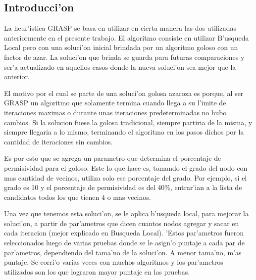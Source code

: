 \subsection{Introducci'on}
La heur'istica GRASP se basa en utilizar en cierta manera las dos utilizadas anteriormente en el presente trabajo. El algoritmo consiste en utilizar B'usqueda Local pero con una soluci'on inicial brindada por un algoritmo goloso con un factor de azar. La soluci'on que brinda se guarda para futuras comparaciones y ser'a actualizado en aquellos casos donde la nueva soluci'on sea mejor que la anterior.

El motivo por el cual se parte de una soluci'on golosa azaroza es porque, al ser GRASP un algoritmo que solamente termina cuando llega a su l'imite de iteraciones maximas o durante unas iteraciones predeterminadas no hubo cambios. Si la solucion fuese la golosa tradicional, siempre partiria de la misma, y siempre llegaria a lo mismo, terminando el algoritmo en los pasos dichos por la cantidad de iteraciones sin cambios.

Es por esto que se agrega un parametro que determina el porcentaje de permisividad para el goloso. Este lo que hace es, tomando el grado del nodo con mas cantidad de vecinos, utiliza solo ese porcentaje del grado. Por ejemplo, si el grado es 10 y el porcentaje de permisividad es del 40\%, entrar'ian a la lista de candidatos todos los que tienen 4 o mas vecinos.

Una vez que tenemos esta soluci'on, se le aplica b'usqueda local, para mejorar la soluci'on, a partir de par'ametros que dicen cuantos nodos agregar y sacar en cada iteracion (mejor explicado en Busqueda Local). 'Estos par'ametros fueron seleccionados luego de varias pruebas donde se le asign'o puntaje a cada par de par'ametros, dependiendo del tama'no de la soluci'on. A menor tama'no, m'as puntaje. Se corri'o varias veces con muchos algoritmos y los par'ametros utilizados son los que lograron mayor puntaje en las pruebas.
